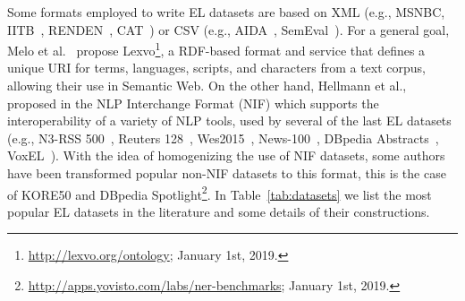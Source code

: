 \documentclass{llncs}
\begin{document}
Some formats employed to write EL datasets are based on XML (e.g., MSNBC, IITB~\cite{IITB2009}, RENDEN~\cite{renden2016}, CAT~\cite{meantime2016}) or CSV (e.g., AIDA~\cite{aida2011}, SemEval~\cite{moro2015semeval}). For a general goal, Melo et al.~\cite{Lexvo2008} propose Lexvo\footnote{\url{http://lexvo.org/ontology}; January 1st, 2019.}, a RDF-based format and service that defines a unique URI for terms, languages, scripts, and characters from a text corpus, allowing their use in Semantic Web. %
On the other hand, Hellmann et al., proposed in \cite{NIFpaper} the NLP Interchange Format (NIF) which supports the interoperability of a variety of NLP tools, used by several of the last EL datasets (e.g., N3-RSS 500~\cite{N3}, Reuters 128~\cite{N3}, Wes2015~\cite{wes2015}, News-100~\cite{N3}, DBpedia Abstracts~\cite{abstracts2016}, VoxEL~\cite{VoxEL2018}). With the idea of homogenizing the use of NIF datasets, some authors have been transformed popular non-NIF datasets to this format, this is the case of  KORE50 and DBpedia Spotlight\footnote{\url{http://apps.yovisto.com/labs/ner-benchmarks}; January 1st, 2019.}. In Table~\ref{tab:datasets} we list the most popular EL datasets in the literature and some details of their constructions.
\end{document}
